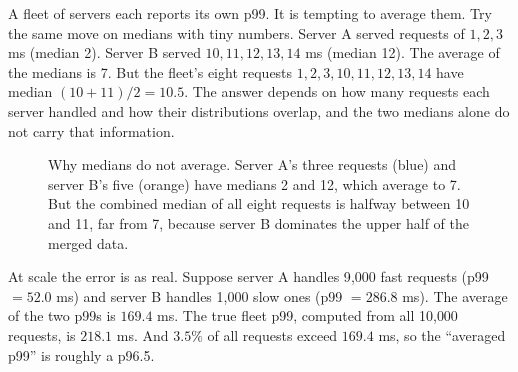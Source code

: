 A fleet of servers each reports its own p99. It is tempting to average them. Try the
same move on medians with tiny numbers. Server A served requests of $1, 2, 3$ ms
(median 2). Server B served $10, 11, 12, 13, 14$ ms (median 12). The average of the
medians is 7. But the fleet's eight requests $1, 2, 3, 10, 11, 12, 13, 14$ have median
$(10 + 11)/2 = 10.5$. The answer depends on how many requests each server handled and
how their distributions overlap, and the two medians alone do not carry that
information.

\begin{figure}[H]
\centering
{}
\caption{Why medians do not average. Server A's three requests (blue) and server B's five (orange) have medians 2 and 12, which average to 7. But the combined median of all eight requests is halfway between 10 and 11, far from 7, because server B dominates the upper half of the merged data.}
\label{fig:quantiles-medians-avg}
\end{figure}


At scale the error is as real. Suppose server A handles 9{,}000 fast requests
(p99 $= 52.0$ ms) and server B handles 1{,}000 slow ones (p99 $= 286.8$ ms). The average
of the two p99s is $169.4$ ms. The true fleet p99, computed from all 10{,}000 requests,
is $218.1$ ms. And $3.5\%$ of all requests exceed $169.4$ ms, so the ``averaged p99''
is roughly a p96.5.

